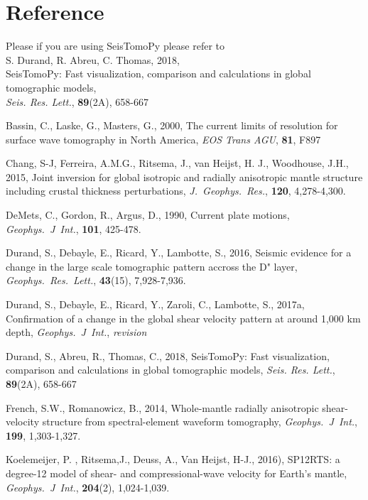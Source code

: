 \documentclass[12pt]{article}
\newcommand{\gji}{\textit{Geophys.\ J\ Int.}, }
\newcommand{\grl}{\textit{Geophys.\ Res.\ Lett.}, }
\newcommand{\jgr}{\textit{J.\ Geophys.\ Res.}, }
\newcommand{\srl}{\textit{Seis. Res. Lett.}, }
\begin{document}
\section{Reference}

Please if you are using SeisTomoPy please refer to \\

\noindent S. Durand, R. Abreu, C. Thomas, 2018,\\
SeisTomoPy: Fast visualization, comparison and calculations in global tomographic models,\\
\srl \textbf{89}(2A), 658-667


\begin{thebibliography}{}

Bassin, C., Laske, G., Masters, G., 2000,
The current limits of resolution for surface wave tomography in North America, 
\textit{EOS Trans AGU}, \textbf{81}, F897

Chang, S-J, Ferreira, A.M.G., Ritsema, J., van Heijst, H. J., Woodhouse, J.H., 2015, 
Joint inversion for global isotropic and radially anisotropic mantle structure including crustal thickness perturbations, 
\jgr \textbf{120}, 4,278-4,300. 

DeMets, C., Gordon, R., Argus, D., 1990,
Current plate motions,
\gji \textbf{101}, 425-478.


Durand, S., Debayle, E., Ricard, Y., Lambotte, S., 2016, 
Seismic evidence for a change in the large scale tomographic pattern accross the D" layer, 
\grl \textbf{43}(15), 7,928-7,936. 

Durand, S., Debayle, E., Ricard, Y., Zaroli, C., Lambotte, S., 2017a, 
Confirmation of a change in the global shear velocity pattern at around 1,000 km depth, 
\gji \textit{revision}

Durand, S., Abreu, R., Thomas, C., 2018, 
SeisTomoPy: Fast visualization, comparison and calculations in global tomographic models,
\srl \textbf{89}(2A), 658-667

French, S.W., Romanowicz, B., 2014, 
Whole-mantle radially anisotropic shear-velocity structure from spectral-element waveform tomography, 
\gji \textbf{199}, 1,303-1,327.

Koelemeijer, P. , Ritsema,J.,  Deuss, A., Van Heijst, H-J., 2016),
SP12RTS: a degree-12 model of shear- and compressional-wave velocity for Earth's mantle,
\gji \textbf{204}(2), 1,024-1,039.


\end{thebibliography}
\end{document}
